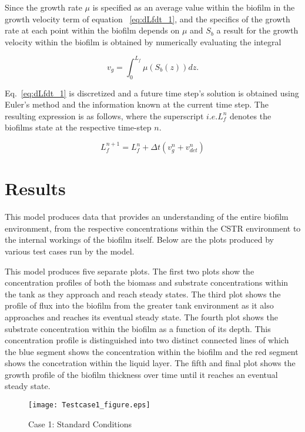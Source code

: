 \documentclass[letterpaper, twoside]{article}
\numberwithin{equation}{section}
\newcommand{\ie}{i.e.}
\begin{document}
Since the growth rate $\mu$ is specified as an average value within the biofilm in the growth velocity term of equation ~\ref{eq:dLfdt_1}, and the specifics of the growth rate at each point within the biofilm depends on $\mu$ and $S_b$ a result for the growth velocity within the biofilm is obtained by numerically evaluating the integral 

\begin{equation}
  \label{eq:vg_int}
  {v_g}={\int_{0}^{L_f}\mu(S_b(z)) dz}.
\end{equation}

Eq.~\ref{eq:dLfdt_1} is discretized and a future time step's solution is obtained using Euler's method and the information known at the current time step. The resulting expression is as follows, where the superscript $\ie L_f^{n}$ denotes the biofilms state at the respective time-step $n$.

\begin{equation}
  \label{eq:dLfdt_2}
  {L_f^{n+1}}={L_f^{n}} + {\Delta t}({v_g^{n}+v_{det}^{n}})
\end{equation}

\section{Results}
This model produces data that provides an understanding of the entire biofilm environment, from the respective concentrations within the CSTR environment to the internal workings of the biofilm itself. Below are the plots produced by various test cases run by the model.

This model produces five separate plots. The first two plots show the concentration profiles of both the biomass and substrate concentrations within the tank as they approach and reach steady states. The third plot shows the profile of flux into the biofilm from the greater tank environment as it also approaches and reaches its eventual steady state. The fourth plot shows the substrate concentration within the biofilm as a function of its depth. This concentration profile is distinguished into two distinct connected lines of which the blue segment shows the concentration within the biofilm and the red segment shows the concetration within the liquid layer. The fifth and final plot shows the growth profile of the biofilm thickness over time until it reaches an eventual steady state.

\begin{figure}[H]
  \centering
  \texttt{[image: Testcase1\_figure.eps]}
  \caption{Case 1: Standard Conditions}
\end{figure}
\end{document}
